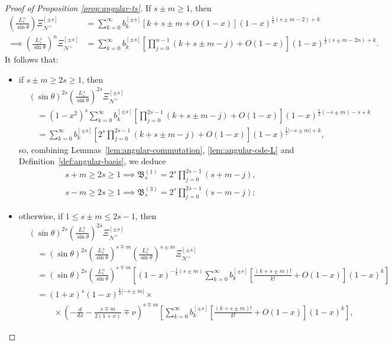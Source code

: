 \documentclass[11pt]{article}
\newcommand{\cN}{\mathcal N}
\numberwithin{equation}{section}
\begin{document}
\begin{proof}[Proof of Proposition \ref{prop:angular-ts}]
If $s\pm m\geq 1$, then
\begin{align*}
\left(\frac{L^{\pm}_s}{\sin\theta}\right) \Xi^{[\pm s]}_{\cN^+} 
&=\sum_{k=0}^\infty b_k^{[\pm s]}\left[k+s\pm m+O(1-x)\right](1-x)^{\frac12(s\pm m-2)+k}\\
\implies \left(\frac{L^{\pm}_s}{\sin\theta}\right)^n \Xi^{[\pm s]}_{\cN^+} &=\sum_{k=0}^\infty b_k^{[\pm s]}\left[\prod_{j=0}^{n-1} (k+s\pm m-j)+O(1-x)\right](1-x)^{\frac12(s\pm m-2n)+k}.
\end{align*}
It follows that:
\begin{itemize}
\item if $s\pm m \geq 2s\geq 1$, then 
\begin{align*}
&(\sin\theta)^{2s}\left(\frac{L^{\pm}_s}{\sin\theta}\right)^{2s} \Xi^{[\pm s]}_{\cN^+}  \\
%
&\quad = (1-x^2)^{s}\sum_{k=0}^\infty b_k^{[\pm s]}\left[\prod_{j=0}^{2s-1} (k+s\pm m-j)+O(1-x)\right](1-x)^{\frac12(-s\pm m)-s+k} \\
%
&\quad = \sum_{k=0}^\infty b_k^{[\pm s]}\left[2^{s}\prod_{j=0}^{2s-1} (k+s\pm m-j)+O(1-x)\right](1-x)^{\frac12|-s\pm m|+k},
\end{align*}
so, combining Lemmas~\ref{lem:angular-commutation}, \ref{lem:angular-ode-L} and Definition~\ref{def:angular-basis}, we deduce
\begin{align*}
s+ m \geq 2s\geq 1\implies \mathfrak B_s^{(1)}= 2^{s}\prod_{j=0}^{2s-1} (s+ m-j), \\ s- m \geq 2s\geq 1 \implies \mathfrak B_s^{(3)}=2^{s}\prod_{j=0}^{2s-1} (s- m-j);
\end{align*}
\item otherwise, if $1\leq s\pm m \leq 2s-1$, then 
\begin{align*}
&(\sin\theta)^{2s}\left(\frac{L^{\pm}_s}{\sin\theta}\right)^{2s} \Xi^{[\pm s]}_{\cN^+} \\
 &\quad =(\sin\theta)^{2s}\left(\frac{L^{\pm}_s}{\sin\theta}\right)^{s\mp m}\left(\frac{L^{\pm}_s}{\sin\theta}\right)^{s\pm m} \Xi^{[\pm s]}_{\cN^+}\\
 &\quad =(\sin\theta)^{2s}\left(\frac{L^{\pm}_s}{\sin\theta}\right)^{s\mp m}\left[(1-x)^{-\frac12(s\pm m)}\sum_{k=0}^\infty b_k^{[\pm s]}\left[\frac{(k+s\pm m)!}{k!}+O(1-x)\right](1-x)^{k}\right]\\
 &\quad =(1+x)^{s}(1-x)^{\frac12|-s\pm m|}\times\\
 &\quad\qquad \times\left(-\frac{d}{dx}-\frac{s\mp m}{2(1+x)}\mp \nu\right)^{s\mp m}\left[\sum_{k=0}^\infty b_k^{[\pm s]}\left[\frac{(k+s\pm m)!}{k!}+O(1-x)\right](1-x)^{k}\right],

\end{align*}
\end{itemize}
\end{proof}
\end{document}
